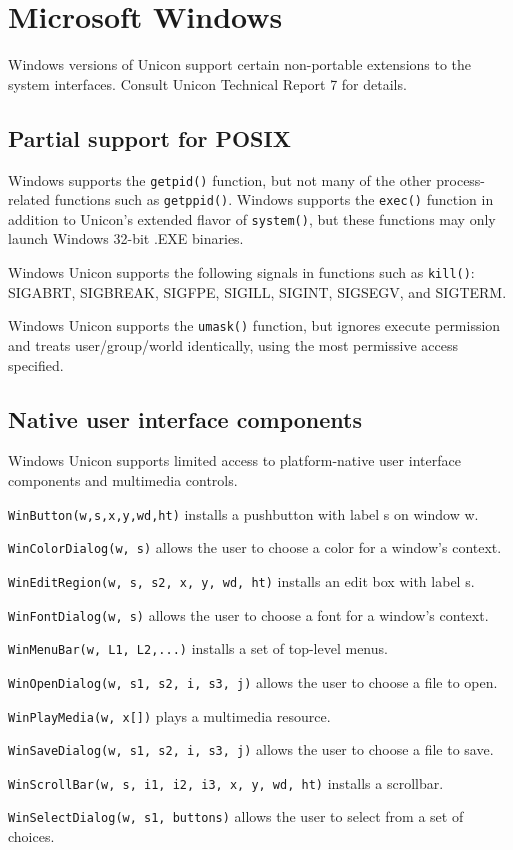 \section{Microsoft Windows}

Windows versions of Unicon support certain non-portable extensions to
the system interfaces. Consult Unicon Technical Report 7 for details.

\subsection{Partial support for POSIX}

Windows supports the \texttt{getpid()} function, but not many of the other
process-related functions such as \texttt{getppid()}. Windows supports the
\texttt{exec()} function in addition to Unicon's extended
flavor of \texttt{system()}, but these functions may only launch Windows 32-bit
.EXE binaries.

Windows Unicon supports the following signals in functions such as
\texttt{kill()}: SIGABRT, SIGBREAK, SIGFPE, SIGILL, SIGINT, SIGSEGV, and
SIGTERM.

Windows Unicon supports the \texttt{umask()} function, but ignores execute
permission and treats user/group/world identically, using the most
permissive access specified.

\subsection{Native user interface components}

Windows Unicon supports limited access to platform-native user interface
components and multimedia controls.

\texttt{WinButton(w,s,x,y,wd,ht)} installs a pushbutton with label s on window w.

\texttt{WinColorDialog(w, s)} allows the user to choose a color for a
window's context.

\texttt{WinEditRegion(w, s, s2, x, y, wd, ht)} installs an edit box with label s.

\texttt{WinFontDialog(w, s)} allows the user to choose a font for a
window's context.

\texttt{WinMenuBar(w, L1, L2,...)} installs a set of top-level menus.

\texttt{WinOpenDialog(w, s1, s2, i, s3, j)} allows the user to choose a file to
open.

\texttt{WinPlayMedia(w, x[])} plays a multimedia resource.

\texttt{WinSaveDialog(w, s1, s2, i, s3, j)} allows the user to choose a file to
save.

\texttt{WinScrollBar(w, s, i1, i2, i3, x, y, wd, ht)} installs a scrollbar.

\texttt{WinSelectDialog(w, s1, buttons)} allows the user to select from a set of
choices.

